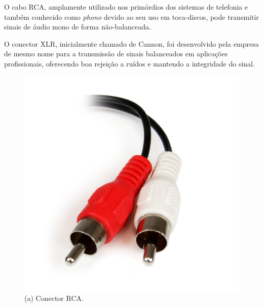 O cabo RCA, %
amplamente utilizado nos primórdios dos sistemas de telefonia e também conhecido como \textit{phono} devido ao seu uso em toca-discos, pode transmitir sinais de áudio mono de forma não-balanceada.%


O conector XLR, inicialmente chamado de Cannon, foi desenvolvido pela empresa de mesmo nome para a transmissão de sinais balanceados em aplicações profissionais, oferecendo boa rejeição a ruídos e mantendo a integridade do sinal.

\begin{figure}[htpb]
    \centering
    \begin{minipage}[t]{0.3\textwidth}
        \centering
        \includegraphics[width=\textwidth]{figuras/fig22.png}
        \vspace{0.3cm} %
        (a) Conector RCA.
    \end{minipage}
    \hspace{1cm}
    \begin{minipage}[t]{0.3\textwidth}
        \centering

\end{minipage}
\end{figure}
